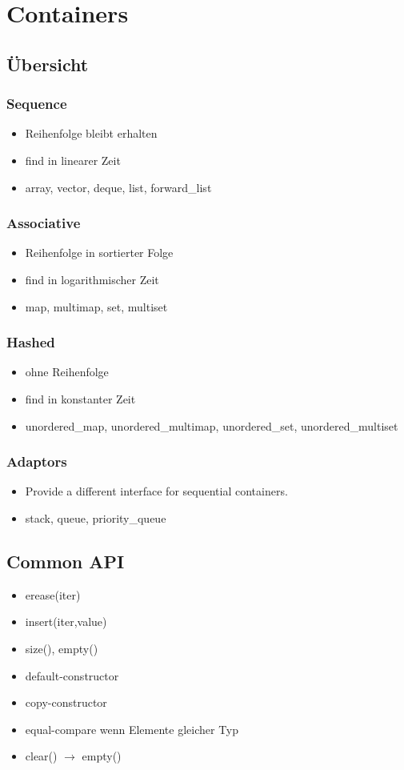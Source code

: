 \section{Containers}
\subsection{Übersicht}
\subsubsection{Sequence}
\begin{itemize}
	\item Reihenfolge bleibt erhalten
	\item find  in linearer Zeit
	\item array, vector, deque, list, forward\_list
\end{itemize}
\subsubsection{Associative}
\begin{itemize}
	\item Reihenfolge in sortierter Folge
	\item find  in logarithmischer Zeit
	\item map, multimap, set, multiset
\end{itemize}
\subsubsection{Hashed}
\begin{itemize}
	\item ohne Reihenfolge
	\item find  in konstanter Zeit
	\item unordered\_map, unordered\_multimap, \newline
		unordered\_set, unordered\_multiset
\end{itemize}
\subsubsection{Adaptors}
\begin{itemize}
	\item Provide a different interface for sequential containers. 
	\item stack, queue, priority\_queue
\end{itemize}
\subsection{Common API}
\begin{itemize}
	\item erease(iter)
	\item insert(iter,value)
	\item size(), empty()
	\item default-constructor
	\item copy-constructor
	\item equal-compare wenn Elemente gleicher Typ
	\item clear() $\rightarrow$ empty()
\end{itemize}
